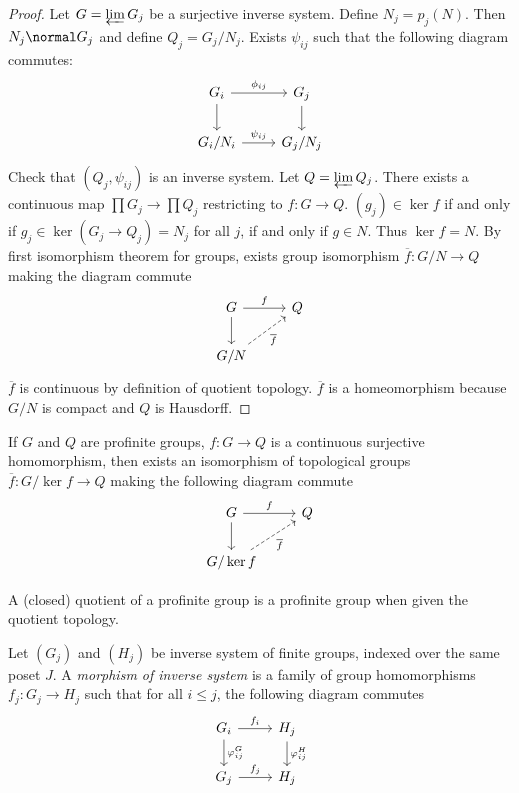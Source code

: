 \documentclass[a4paper]{article}
\begin{document}
\begin{proof}
  Let \(G = \varprojlim G_j\) be a surjective inverse system. Define \(N_j = p_j(N)\). Then \(N_j \normal G_j\) and define \(Q_j = G_j/N_j\). Exists \(\psi_{ij}\) such that the following diagram commutes:
  \[
    \begin{tikzcd}
      G_i \ar[r, "\phi_{ij}"] \ar[d] & G_j \ar[d] \\
      G_i/N_i \ar[r, "\psi_{ij}"] & G_j/N_j
    \end{tikzcd}
  \]
  Check that \((Q_j, \psi_{ij})\) is an inverse system. Let \(Q = \varprojlim Q_j\). There exists a continuous map \(\prod G_j \to \prod Q_j\) restricting to \(f: G \to Q\). \((g_j) \in \ker f\) if and only if \(g_j \in \ker (G_j \to Q_j) = N_j\) for all \(j\), if and only if \(g \in N\). Thus \(\ker f = N\). By first isomorphism theorem for groups, exists group isomorphism \(\overline f: G/N \to Q\) making the diagram commute
  \[
    \begin{tikzcd}
      G \ar[r, "f"] \ar[d] & Q \\
      G/N \ar[ur, "\overline f"', dashed]
    \end{tikzcd}
  \]
  \(\overline f\) is continuous by definition of quotient topology. \(\overline f\) is a homeomorphism because \(G/N\) is compact and \(Q\) is Hausdorff.
\end{proof}

\begin{theorem}
  If \(G\) and \(Q\) are profinite groups, \(f: G \to Q\) is a continuous surjective homomorphism, then exists an isomorphism of topological groups \(\overline f: G/\ker f \to Q\) making the following diagram commute
  \[
    \begin{tikzcd}
      G \ar[r, "f"] \ar[d] & Q \\
      G/\ker f \ar[ur, "\overline f"', dashed]
    \end{tikzcd}
  \]
\end{theorem}

\begin{corollary}
  A (closed) quotient of a profinite group is a profinite group when given the quotient topology.
\end{corollary}

\begin{definition}
  Let \((G_j)\) and \((H_j)\) be inverse system of finite groups, indexed over the same poset \(J\). A \emph{morphism of inverse system} is a family of group homomorphisms \(f_j: G_j \to H_j\) such that for all \(i \leq j\), the following diagram commutes
  \[
    \begin{tikzcd}
      G_i \ar[r, "f_i"] \ar[d, "\varphi_{ij}^G"] & H_j \ar[d, "\varphi_{ij}^H"] \\
      G_j \ar[r, "f_j"] & H_j
    \end{tikzcd}
  \]
\end{definition}
\end{document}
